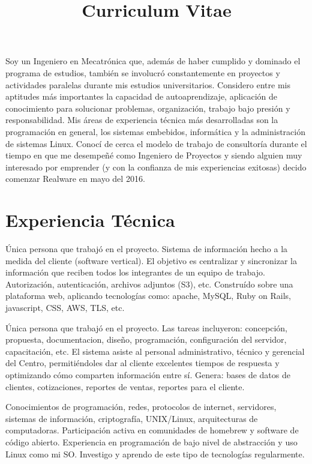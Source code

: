 \documentclass[11pt,a4paper,sans]{moderncv}	%
\title{Curriculum Vitae}
\begin{document}
\maketitle
Soy un Ingeniero en Mecatrónica que, además de haber cumplido y dominado el programa de estudios, también se involucró constantemente en proyectos y actividades paralelas durante mis estudios universitarios. Considero entre mis aptitudes más importantes la capacidad de autoaprendizaje, aplicación de conocimiento para solucionar problemas, organización, trabajo bajo presión y responsabilidad. Mis áreas de experiencia técnica más desarrolladas son la programación en general, los sistemas embebidos, informática y la administración de sistemas Linux. Conocí de cerca el modelo de trabajo de consultoría durante el tiempo en que me desempeñé como Ingeniero de Proyectos y siendo alguien muy interesado por emprender (y con la confianza de mis experiencias exitosas) decido comenzar Realware en mayo del 2016.

\section{Experiencia Técnica}
{Única persona que trabajó en el proyecto. Sistema de información hecho a la medida del cliente (software vertical). El objetivo es centralizar y sincronizar la información que reciben todos los integrantes de un equipo de trabajo. Autorización, autenticación, archivos adjuntos (S3), etc. Construído sobre una plataforma web, aplicando tecnologías como: apache, MySQL, Ruby on Rails, javascript, CSS, AWS, TLS, etc.}

{Única persona que trabajó en el proyecto. Las tareas incluyeron: concepción, propuesta, documentacion, diseño, programación, configuración del servidor, capacitación, etc. El sistema asiste al personal administrativo, técnico y gerencial del Centro, permitiéndoles dar al cliente excelentes tiempos de respuesta y optimizando cómo comparten información entre sí. Genera: bases de datos de clientes, cotizaciones, reportes de ventas, reportes para el cliente.}

{Conocimientos de programación, redes, protocolos de internet, servidores, sistemas de información, criptografía, UNIX/Linux, arquitecturas de computadoras. Participación activa en comunidades de homebrew y software de código abierto. Experiencia en programación de bajo nivel de abstracción y uso Linux como mi SO. Investigo y aprendo de este tipo de tecnologías regularmente.}
\end{document}
